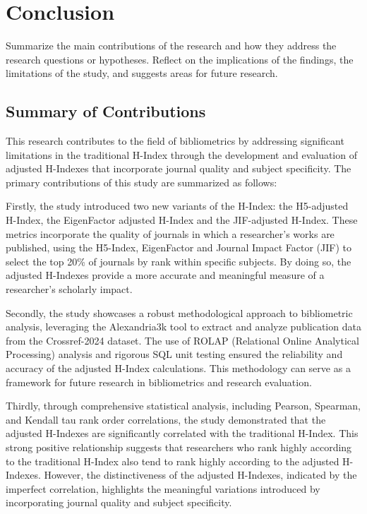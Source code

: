 \chapter{Conclusion}
\label{ch:conclusion}

Summarize the main contributions of the research and how they address the
research questions or hypotheses. Reflect on the implications of the findings,
the limitations of the study, and suggests areas for future research.

\section{Summary of Contributions}

This research contributes to the field of bibliometrics by addressing
significant limitations in the traditional H-Index through the development and
evaluation of adjusted H-Indexes that incorporate journal quality and subject
specificity. The primary contributions of this study are summarized as follows:

Firstly, the study introduced two new variants of the H-Index: the H5-adjusted
H-Index, the EigenFactor adjusted H-Index and the JIF-adjusted H-Index. These
metrics incorporate the quality of journals in which a researcher's works are
published, using the H5-Index, EigenFactor and Journal Impact Factor (JIF) to
select the top 20\% of journals by rank within specific subjects. By doing so,
the adjusted H-Indexes provide a more accurate and meaningful measure of a
researcher's scholarly impact.

Secondly, the study showcases a robust methodological approach to bibliometric
analysis, leveraging the Alexandria3k tool to extract and analyze publication
data from the Crossref-2024 dataset. The use of ROLAP (Relational Online
Analytical Processing) analysis and rigorous SQL unit testing ensured the
reliability and accuracy of the adjusted H-Index calculations. This methodology
can serve as a framework for future research in bibliometrics and research
evaluation.

Thirdly, through comprehensive statistical analysis, including Pearson,
Spearman, and Kendall tau rank order correlations, the study demonstrated that
the adjusted H-Indexes are significantly correlated with the traditional
H-Index. This strong positive relationship suggests that researchers who rank
highly according to the traditional H-Index also tend to rank highly according
to the adjusted H-Indexes. However, the distinctiveness of the adjusted
H-Indexes, indicated by the imperfect correlation, highlights the meaningful
variations introduced by incorporating journal quality and subject specificity.

